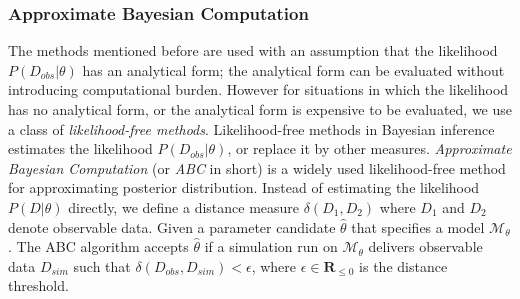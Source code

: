 \subsubsection{Approximate Bayesian Computation}
The methods mentioned before are used with an assumption that the likelihood $P(D_{obs}|\theta)$ has
an analytical form; the analytical form can be evaluated without introducing computational burden.
However for situations in which the likelihood has no analytical form, or the analytical form is
expensive to be evaluated, we use a class of \textit{likelihood-free methods}. Likelihood-free
methods in Bayesian inference estimates the likelihood $P(D_{obs}|\theta)$, or replace it by other
measures. \textit{Approximate Bayesian Computation} (or \textit{ABC} in short)
\cite{toni2009approximate} is a widely used likelihood-free method for approximating posterior
distribution. Instead of estimating the likelihood $P(D|\theta)$ directly, we define a distance
measure $\delta(D_1, D_2)$ where $D_1$ and $D_2$ denote observable data. Given a parameter candidate
$\hat{\theta}$ that specifies a model $\mathcal{M}_\theta$. The ABC algorithm accepts $\hat{\theta}$
if a simulation run on $\mathcal{M}_\theta$ delivers observable data $D_{sim}$ such that
$\delta(D_{obs},D_{sim}) < \epsilon$, where $\epsilon\in\mathbf{R}_{\leq 0}$ is the distance
threshold.
